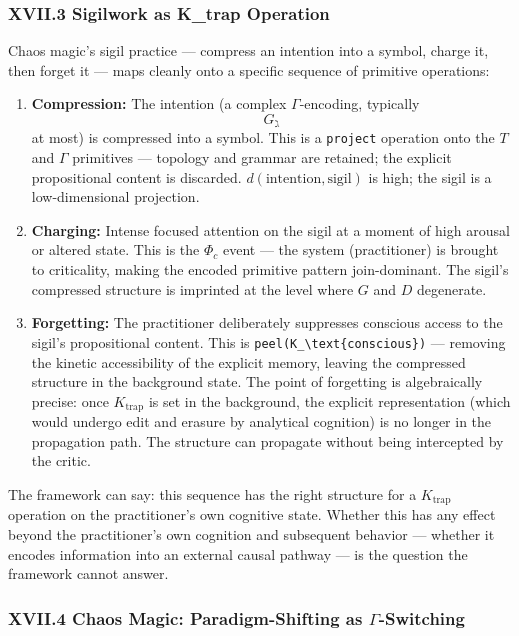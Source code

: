 \documentclass[12pt,a4paper]{article}
\begin{document}
\subsubsection{XVII.3 Sigilwork as K\_trap Operation}

Chaos magic's sigil practice --- compress an intention into a symbol, charge it, then forget it --- maps cleanly onto a specific sequence of primitive operations:

\begin{enumerate}
    \item \textbf{Compression:} The intention (a complex $\Gamma$-encoding, typically $$G_{\gimel}$$ at most) is compressed into a symbol. This is a \texttt{project} operation onto the $T$ and $\Gamma$ primitives --- topology and grammar are retained; the explicit propositional content is discarded. $d(\text{intention}, \text{sigil})$ is high; the sigil is a low-dimensional projection.
    \item \textbf{Charging:} Intense focused attention on the sigil at a moment of high arousal or altered state. This is the $\Phi_c$ event --- the system (practitioner) is brought to criticality, making the encoded primitive pattern join-dominant. The sigil's compressed structure is imprinted at the level where $G$ and $D$ degenerate.
    \item \textbf{Forgetting:} The practitioner deliberately suppresses conscious access to the sigil's propositional content. This is \texttt{peel(K\_\textbackslash{}text\{conscious\})} --- removing the kinetic accessibility of the explicit memory, leaving the compressed structure in the background state. The point of forgetting is algebraically precise: once $K_\text{trap}$ is set in the background, the explicit representation (which would undergo edit and erasure by analytical cognition) is no longer in the propagation path. The structure can propagate without being intercepted by the critic.
\end{enumerate}

The framework can say: this sequence has the right structure for a $K_\text{trap}$ operation on the practitioner's own cognitive state. Whether this has any effect beyond the practitioner's own cognition and subsequent behavior --- whether it encodes information into an external causal pathway --- is the question the framework cannot answer.

\subsubsection{XVII.4 Chaos Magic: Paradigm-Shifting as $\Gamma$-Switching}
\end{document}
